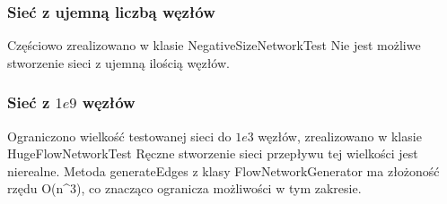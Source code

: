 \subsubsection{Sieć z ujemną liczbą węzłów}
Częściowo zrealizowano w klasie NegativeSizeNetworkTest Nie jest możliwe
stworzenie sieci z ujemną ilością węzłów.

\subsubsection{Sieć z $1e9$ węzłów}
Ograniczono wielkość testowanej sieci do $1e3$ węzłów, zrealizowano w klasie
HugeFlowNetworkTest Ręczne stworzenie sieci przepływu tej wielkości jest
nierealne. Metoda generateEdges z klasy FlowNetworkGenerator ma złożoność
rzędu O(n^3), co znacząco ogranicza możliwości w tym zakresie.

